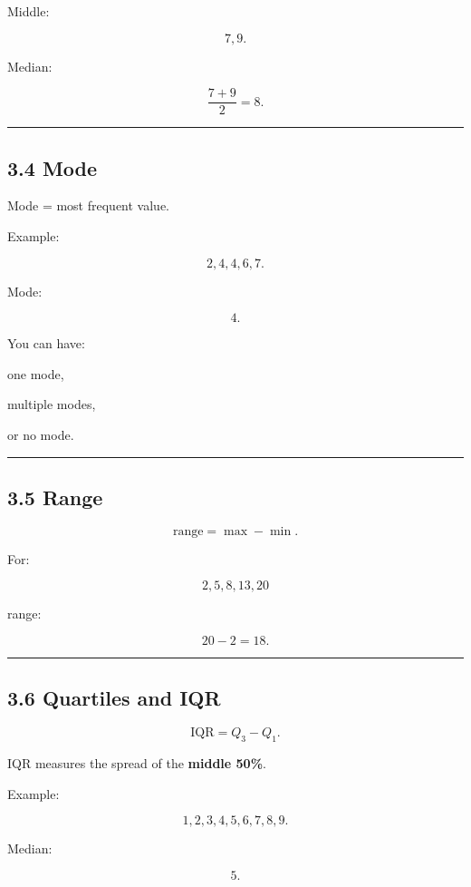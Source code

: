 \documentclass[
]{article}
\begin{document}
Middle:

\[
7,9.
\]

Median:

\[
\frac{7+9}{2}=8.
\]

\begin{center}\rule{0.5\linewidth}{0.5pt}\end{center}

\subsection{3.4 Mode}\label{mode}

Mode = most frequent value.

Example:

\[
2,4,4,6,7.
\]

Mode:

\[
\boxed4.
\]

You can have:

one mode,

multiple modes,

or no mode.

\begin{center}\rule{0.5\linewidth}{0.5pt}\end{center}

\subsection{3.5 Range}\label{range}

\[
\boxed{\text{range}=\max-\min}.
\]

For:

\[
2,5,8,13,20
\]

range:

\[
20-2=18.
\]

\begin{center}\rule{0.5\linewidth}{0.5pt}\end{center}

\subsection{3.6 Quartiles and IQR}\label{quartiles-and-iqr}

\[
\boxed{\text{IQR}=Q_3-Q_1}.
\]

IQR measures the spread of the \textbf{middle 50\%}.

Example:

\[
1,2,3,4,5,6,7,8,9.
\]

Median:

\[
5.
\]
\end{document}
